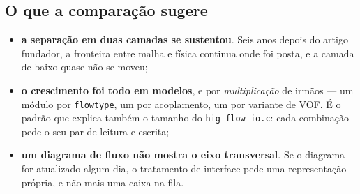 \subsection{O que a compara\c{c}\~ao sugere}

\begin{itemize}
  \item \textbf{a separa\c{c}\~ao em duas camadas se sustentou}. Seis anos depois
    do artigo fundador, a fronteira entre malha e f\'isica continua onde foi
    posta, e a camada de baixo quase n\~ao se moveu;
  \item \textbf{o crescimento foi todo em modelos}, e por
    \emph{multiplica\c{c}\~ao} de irm\~aos --- um m\'odulo por \texttt{flowtype},
    um por acoplamento, um por variante de VOF. \'E o padr\~ao que explica
    tamb\'em o tamanho do \texttt{hig-flow-io.c}: cada combina\c{c}\~ao pede o seu
    par de leitura e escrita;
  \item \textbf{um diagrama de fluxo n\~ao mostra o eixo transversal}. Se o
    diagrama for atualizado algum dia, o tratamento de interface pede uma
    representa\c{c}\~ao pr\'opria, e n\~ao mais uma caixa na fila.
\end{itemize}
